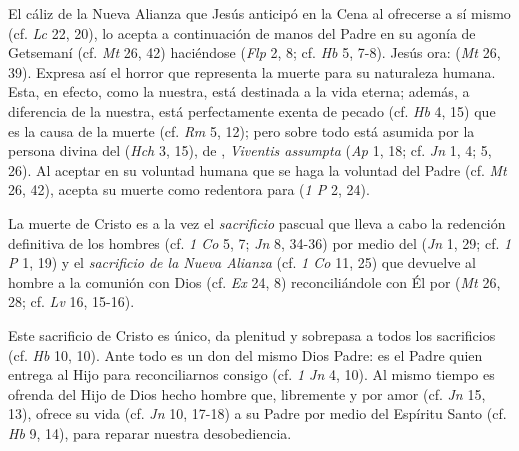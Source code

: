 \begin{ccebody}

 El cáliz de la Nueva Alianza que Jesús anticipó en la Cena al ofrecerse a sí mismo (cf. \textit{Lc} 22, 20), lo acepta a continuación de manos del Padre en su agonía de Getsemaní (cf. \textit{Mt} 26, 42) haciéndose  (\textit{Flp} 2, 8; cf. \textit{Hb} 5, 7-8). Jesús ora:  (\textit{Mt} 26, 39). Expresa así el horror que representa la muerte para su naturaleza humana. Esta, en efecto, como la nuestra, está destinada a la vida eterna; además, a diferencia de la nuestra, está perfectamente exenta de pecado (cf. \textit{Hb} 4, 15) que es la causa de la muerte (cf. \textit{Rm} 5, 12); pero sobre todo está asumida por la persona divina del  (\textit{Hch} 3, 15), de , \textit{Viventis assumpta} (\textit{Ap} 1, 18; cf. \textit{Jn} 1, 4; 5, 26). Al aceptar en su voluntad humana que se haga la voluntad del Padre (cf. \textit{Mt} 26, 42), acepta su muerte como redentora para  (\textit{1 P} 2, 24).


 La muerte de Cristo es a la vez el \textit{sacrificio} pascual que lleva a cabo la redención definitiva de los hombres (cf. \textit{1 Co} 5, 7; \textit{Jn} 8, 34-36) por medio del  (\textit{Jn} 1, 29; cf. \textit{1 P} 1, 19) y el \textit{sacrificio de la Nueva Alianza} (cf. \textit{1 Co} 11, 25) que devuelve al hombre a la comunión con Dios (cf. \textit{Ex} 24, 8) reconciliándole con Él por  (\textit{Mt} 26, 28; cf. \textit{Lv} 16, 15-16).

 Este sacrificio de Cristo es único, da plenitud y sobrepasa a todos los sacrificios (cf. \textit{Hb} 10, 10). Ante todo es un don del mismo Dios Padre: es el Padre quien entrega al Hijo para reconciliarnos consigo (cf. \textit{1 Jn} 4, 10). Al mismo tiempo es ofrenda del Hijo de Dios hecho hombre que, libremente y por amor (cf. \textit{Jn} 15, 13), ofrece su vida (cf. \textit{Jn} 10, 17-18) a su Padre por medio del Espíritu Santo (cf. \textit{Hb} 9, 14), para reparar nuestra desobediencia.



\end{ccebody}
